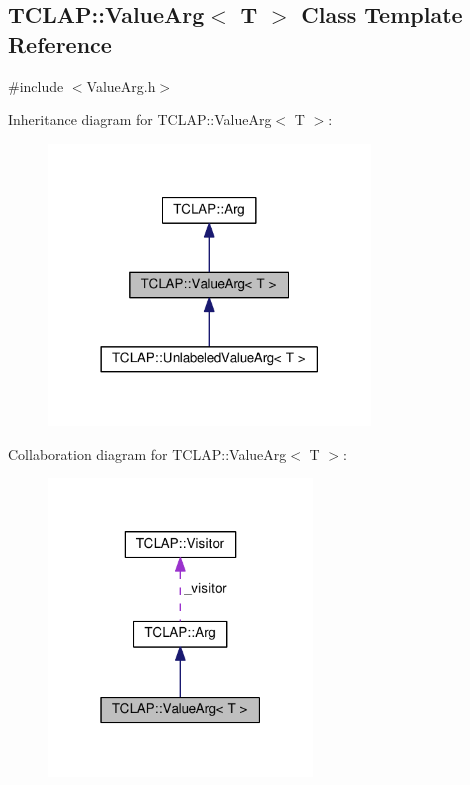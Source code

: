 \hypertarget{classTCLAP_1_1ValueArg}{}\subsection{T\+C\+L\+AP\+:\+:Value\+Arg$<$ T $>$ Class Template Reference}
\label{classTCLAP_1_1ValueArg}


{\ttfamily \#include $<$Value\+Arg.\+h$>$}



Inheritance diagram for T\+C\+L\+AP\+:\+:Value\+Arg$<$ T $>$\+:
\nopagebreak
\begin{figure}[H]
\begin{center}
\leavevmode
\includegraphics[width=242pt]{classTCLAP_1_1ValueArg__inherit__graph}
\end{center}
\end{figure}


Collaboration diagram for T\+C\+L\+AP\+:\+:Value\+Arg$<$ T $>$\+:
\nopagebreak
\begin{figure}[H]
\begin{center}
\leavevmode
\includegraphics[width=199pt]{classTCLAP_1_1ValueArg__coll__graph}
\end{center}
\end{figure}
